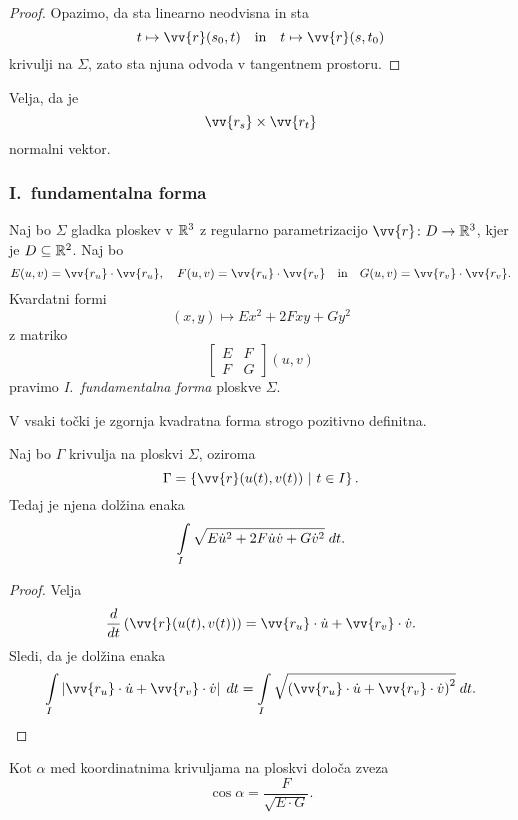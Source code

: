 \begin{proof}
Opazimo, da sta linearno neodvisna in sta
\[
t \mapsto \vv{r}(s_0,t)
\quad \text{in} \quad
t \mapsto \vv{r}(s,t_0)
\]
krivulji na $\Sigma$, zato sta njuna odvoda v tangentnem prostoru.
\end{proof}

\begin{opomba}
Velja, da je
\[
\vv{r_s} \times \vv{r_t}
\]
normalni vektor.
\end{opomba}

\subsubsection{I.~fundamentalna forma}

\begin{definicija}
Naj bo $\Sigma$ gladka ploskev v $\mathbb{R}^3$ z regularno parametrizacijo
$\vv{r} \colon D \to \R^3$, kjer je $D \subseteq \mathbb{R}^2$. Naj bo
\[
E(u,v) = \vv{r_u} \cdot \vv{r_u},
\quad
F(u,v) = \vv{r_u} \cdot \vv{r_v}
\quad \text{in} \quad
G(u,v) = \vv{r_v} \cdot \vv{r_v}.
\]
Kvardatni formi
\[
(x,y) \mapsto Ex^2 + 2Fxy + Gy^2
\]
z matriko
\[
\begin{bmatrix}
E & F \\
F & G
\end{bmatrix}
(u,v)
\]
pravimo
\emph{I.~fundamentalna forma}
ploskve $\Sigma$.
\end{definicija}

\begin{opomba}
V vsaki točki je zgornja kvadratna forma strogo pozitivno
definitna.
\end{opomba}

\begin{trditev}
Naj bo $\Gamma$ krivulja na ploskvi $\Sigma$, oziroma
\[
\Gamma = \setb{\vv{r}(u(t), v(t))}{t \in I}.
\]
Tedaj je njena dolžina enaka
\[
\int\limits_I \sqrt{E \dot{u}^2 + 2F \dot{u} \dot{v} + G \dot{v}^2}\;dt.
\]
\end{trditev}

\begin{proof}
Velja
\[
\frac{d}{dt}\left(\vv{r}(u(t), v(t))\right) =
\vv{r_u} \cdot \dot{u} + \vv{r_v} \cdot \dot{v}.
\]
Sledi, da je dolžina enaka
\[
\lint_I \abs{\vv{r_u} \cdot \dot{u} + \vv{r_v} \cdot \dot{v}}\;dt =
\lint_I \sqrt{
\left(\vv{r_u} \cdot \dot{u} + \vv{r_v} \cdot \dot{v}\right)^2
}\;dt. \qedhere
\]
\end{proof}

\begin{trditev}
Kot $\alpha$ med koordinatnima krivuljama na ploskvi določa zveza
\[
\cos \alpha = \frac{F}{\sqrt{E \cdot G}}.
\]
\end{trditev}

